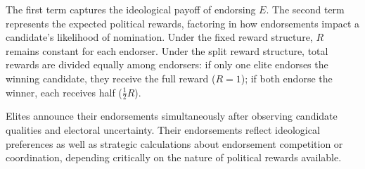 The first term captures the ideological payoff of endorsing $E$. The second term represents the expected political rewards, factoring in how endorsements impact a candidate's likelihood of nomination. Under the fixed reward structure, $R$ remains constant for each endorser. Under the split reward structure, total rewards are divided equally among endorsers: if only one elite endorses the winning candidate, they receive the full reward ($R=1$); if both endorse the winner, each receives half ($\frac{1}{2}R$).

Elites announce their endorsements simultaneously after observing candidate qualities and electoral uncertainty. Their endorsements reflect ideological preferences as well as strategic calculations about endorsement competition or coordination, depending critically on the nature of political rewards available.

